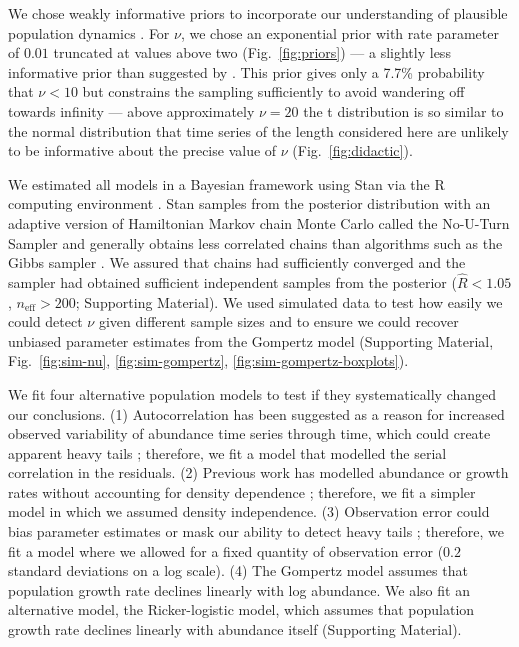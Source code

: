 We chose weakly informative priors to incorporate our understanding of
plausible population dynamics \citep[Supporting Material]{gelman2014}. For
$\nu$, we chose an exponential prior with rate parameter of $0.01$ truncated at
values above two (Fig.~\ref{fig:priors}) --- a slightly less informative prior
than suggested by \citet{fernandez1998}. This prior gives only a 7.7\%
probability that $\nu < 10$ but constrains the sampling sufficiently to avoid
wandering off towards infinity --- above approximately $\nu = 20$ the
t distribution is so similar to the normal distribution that time series of the
length considered here are unlikely to be informative about the precise value
of $\nu$ (Fig.~\ref{fig:didactic}).

We estimated all models in a Bayesian framework using Stan \citep[][version
2.4.0]{stan-manual2014} via the R computing environment \citep{r2014}. Stan
samples from the posterior distribution with an adaptive version of Hamiltonian
Markov chain Monte Carlo called the No-U-Turn Sampler and generally obtains
less correlated chains than algorithms such as the Gibbs sampler
\citep{hoffman2014}. We assured that chains had sufficiently converged and the
sampler had obtained sufficient independent samples from the posterior
($\widehat{R} < 1.05$, $n_\mathrm{eff} > 200$; Supporting Material). We used
simulated data to test how easily we could detect $\nu$ given different sample
sizes and to ensure we could recover unbiased parameter estimates from the
Gompertz model (Supporting Material, Fig.~\ref{fig:sim-nu},
\ref{fig:sim-gompertz}, \ref{fig:sim-gompertz-boxplots}).

We fit four alternative population models to test if they systematically
changed our conclusions. (1) Autocorrelation has been suggested as a reason for
increased observed variability of abundance time series through time, which
could create apparent heavy tails \citep{inchausti2002}; therefore, we fit
a model that modelled the serial correlation in the residuals. (2) Previous
work has modelled abundance or growth rates without accounting for density
dependence \citep{halley2002,segura2013}; therefore, we fit a simpler model in
which we assumed density independence. (3) Observation error could bias
parameter estimates \citep{knape2012} or mask our ability to detect heavy tails
\citep{ward2007}; therefore, we fit a model where we allowed for a fixed
quantity of observation error ($0.2$ standard deviations on a log scale). (4)
The Gompertz model assumes that population growth rate declines linearly with
log abundance. We also fit an alternative model, the Ricker-logistic model,
which assumes that population growth rate declines linearly with abundance
itself (Supporting Material).

